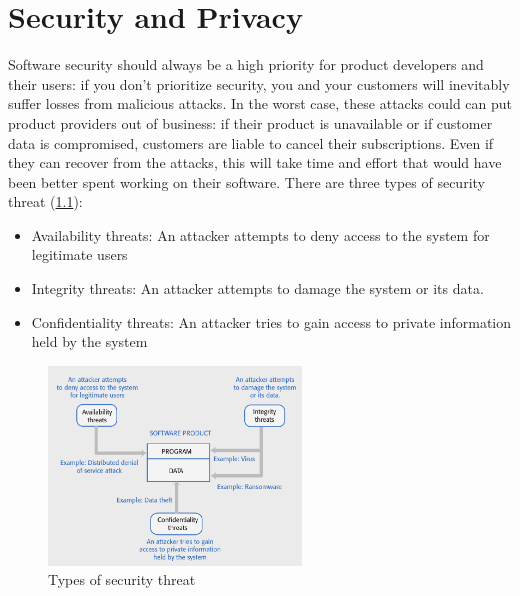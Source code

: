 \documentclass[10pt,a4paper]{report}
\begin{document}
\chapter{Security and Privacy}
 Software security should always be a high priority for product developers
and their users: if you don’t prioritize security, you and your customers will inevitably suffer losses from malicious attacks. In the worst case, these attacks could can put product providers out of
business:  if their product is unavailable or if customer data is compromised, customers are liable to cancel their subscriptions. Even if they can recover from the attacks, this will take time and effort that would have been better spent working on their software.
There are three types of security threat (\ref{image83}):
\begin{itemize}
	\item Availability threats: An attacker attempts to deny access to the system for legitimate users
	\item Integrity threats: An attacker attempts to damage the system or its data.
	\item Confidentiality threats: An attacker tries to gain access to private information held by the system
\end{itemize}
\begin{figure}[h]
	\centering
	\includegraphics[width=0.6\textwidth]{image83}
	\caption{Types of security threat}
	\label{image83}
\end{figure} 
\end{document}
